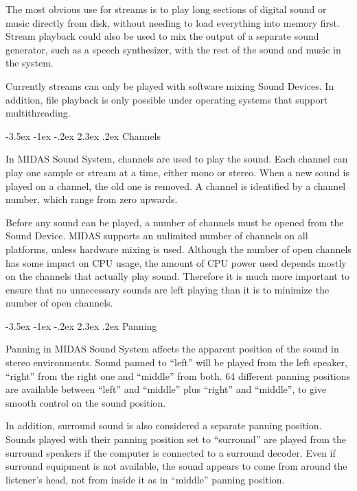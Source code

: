 \documentclass[a4paper,12pt,oneside]{book}
\makeatletter
\renewcommand\section{\@startsection {section}{1}{-20pt}%
                                   {-3.5ex \@plus -1ex \@minus -.2ex}%
                                   {2.3ex \@plus.2ex}%
                                   {\normalfont\Large\bfseries}}
\makeatother
\begin{document}
The most obvious use for streams is to play long sections of digital sound or
music directly from disk, without needing to load everything into memory
first. Stream playback could also be used to mix the output of a separate
sound generator, such as a speech synthesizer, with the rest of the sound and
music in the system.

Currently streams can only be played with software mixing Sound Devices. In
addition, file playback is only possible under operating systems that
support multithreading.


\section{Channels}

In MIDAS Sound System, channels are used to play the sound. Each channel can
play one sample or stream at a time, either mono or stereo. When a new sound
is played on a channel, the old one is removed. A channel is identified by a
channel number, which range from zero upwards.

Before any sound can be played, a number of channels must be opened from the
Sound Device. MIDAS supports an unlimited number of channels on all
platforms, unless hardware mixing is used. Although the number of open
channels has some impact on CPU usage, the amount of CPU power used depends
mostly on the channels that actually play sound. Therefore it is much more
important to ensure that no unnecessary sounds are left playing than it is to
minimize the number of open channels.


\section{Panning}

Panning in MIDAS Sound System affects the apparent position of the sound in
stereo environments. Sound panned to ``left'' will be played from the left
speaker, ``right'' from the right one and ``middle'' from both. 64 different
panning positions are available between ``left'' and ``middle'' plus
``right'' and ``middle'', to give smooth control on the sound position.

In addition, surround sound is also considered a separate panning position.
Sounds played with their panning position set to ``surround'' are played from
the surround speakers if the computer is connected to a surround decoder.
Even if surround equipment is not available, the sound appears to come from
around the listener's head, not from inside it as in ``middle'' panning
position.
\end{document}
